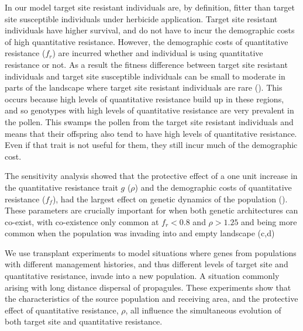 \documentclass[10pt,letterpaper]{article}
\begin{document}
In our model target site resistant individuals are, by definition, fitter than target site susceptible individuals under herbicide application. Target site resistant individuals have higher survival, and do not have to incur the demographic costs of high quantitative resistance. However, the demographic costs of quantitative resistance ($f_r$) are incurred whether and individual is using quantitative resistance or not. As a result the fitness difference between target site resistant individuals and target site susceptible individuals can be small to moderate in parts of the landscape where target site resistant individuals are rare (). This occurs because high levels of quantitative resistance build up in these regions, and so genotypes with high levels of quantitative resistance are very prevalent in the pollen. This swamps the pollen from the target site resistant individuals and means that their offspring also tend to have high levels of quantitative resistance. Even if that trait is not useful for them, they still incur much of the demographic cost.

The sensitivity analysis showed that the protective effect of a one unit increase in the quantitative resistance trait $g$ ($\rho$) and the demographic costs of quantitative resistance ($f_f$), had the largest effect on genetic dynamics of the population (). These parameters are crucially important for when both genetic architectures can co-exist, with co-existence only common at $f_r < 0.8$ and $\rho > 1.25$ and being more common when the  population was invading into and empty landscape (c,d)   

We use transplant experiments to model situations where genes from populations with different management histories, and thus different levels of target site and quantitative resistance, invade into a new population. A situation commonly arising with long distance dispersal of propagules. These experiments show that the characteristics of the source population and receiving area, and the protective effect of quantitative resistance, $\rho$, all influence the simultaneous evolution of both target site and quantitative resistance. 
\end{document}
